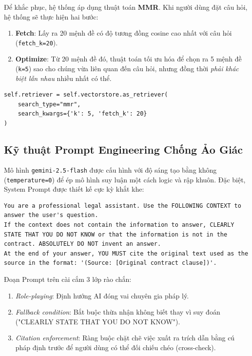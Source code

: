 Để khắc phục, hệ thống áp dụng thuật toán \textbf{MMR}. Khi người dùng đặt câu hỏi, hệ thống sẽ thực hiện hai bước:
\begin{enumerate}
    \item \textbf{Fetch}: Lấy ra 20 mệnh đề có độ tương đồng cosine cao nhất với câu hỏi (\texttt{fetch\_k=20}).
    \item \textbf{Optimize}: Từ 20 mệnh đề đó, thuật toán tối ưu hóa để chọn ra 5 mệnh đề (\texttt{k=5}) sao cho chúng vừa liên quan đến câu hỏi, nhưng đồng thời \textit{phải khác biệt lẫn nhau} nhiều nhất có thể.
\end{enumerate}

\begin{verbatim}
self.retriever = self.vectorstore.as_retriever(
    search_type="mmr",
    search_kwargs={'k': 5, 'fetch_k': 20}
)
\end{verbatim}

\subsection{Kỹ thuật Prompt Engineering Chống Ảo Giác}
Mô hình \texttt{gemini-2.5-flash} được cấu hình với độ sáng tạo bằng không (\texttt{temperature=0}) để ép mô hình suy luận một cách logic và rập khuôn. Đặc biệt, System Prompt được thiết kế cực kỳ khắt khe:

\begin{verbatim}
You are a professional legal assistant. Use the FOLLOWING CONTEXT to answer the user's question.
If the context does not contain the information to answer, CLEARLY STATE THAT YOU DO NOT KNOW or that the information is not in the contract. ABSOLUTELY DO NOT invent an answer.
At the end of your answer, YOU MUST cite the original text used as the source in the format: '(Source: [Original contract clause])'.
\end{verbatim}

Đoạn Prompt trên cài cắm 3 lớp rào chắn:
\begin{enumerate}
    \item \textit{Role-playing}: Định hướng AI đóng vai chuyên gia pháp lý.
    \item \textit{Fallback condition}: Bắt buộc thừa nhận không biết thay vì suy đoán ("CLEARLY STATE THAT YOU DO NOT KNOW").
    \item \textit{Citation enforcement}: Ràng buộc chặt chẽ việc xuất ra trích dẫn bằng cú pháp định trước để người dùng có thể đối chiếu chéo (cross-check).
\end{enumerate}

